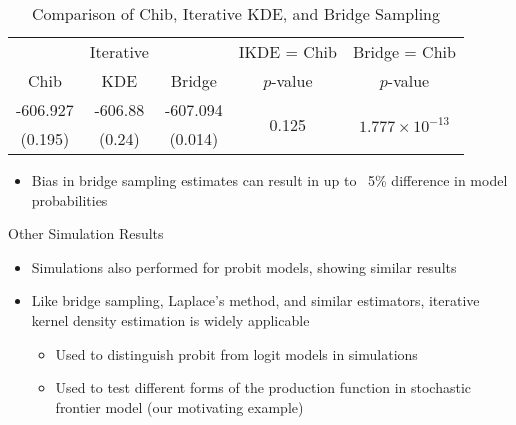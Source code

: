 \documentclass{beamer}
\begin{document}
\begin{frame}{}
\begin{table}
	\centering
	\begin{tabular}{c|c|c|c|c}
		& Iterative &  & IKDE = Chib & Bridge = Chib \\ 
		Chib & KDE & Bridge & $p$-value & $p$-value \\ 
		\hline
		\hline
		-606.927 & -606.88 & -607.094 & \multirow{2}{*}{0.125} & \multirow{2}{*}{$1.777\times 10^{-13}$} \\ 
		(0.195) & (0.24) & (0.014) &  &  \\ 
		\hline
	\end{tabular}
	\caption{Comparison of Chib, Iterative KDE, and Bridge Sampling} 
	\label{tab:bridge}
\end{table}
\begin{itemize}
	\item Bias in bridge sampling estimates can result in up to ~5\% difference in model probabilities
\end{itemize}
\end{frame}

\begin{frame}{Other Simulation Results}
\begin{itemize}
	\item Simulations also performed for probit models, showing similar results
	\item Like bridge sampling, Laplace's method, and similar estimators, iterative kernel density estimation is widely applicable
		\begin{itemize}
			\item Used to distinguish probit from logit models in simulations
			\item Used to test different forms of the production function in stochastic frontier model (our motivating example)
		\end{itemize}
\end{itemize}
\end{frame}
\end{document}
